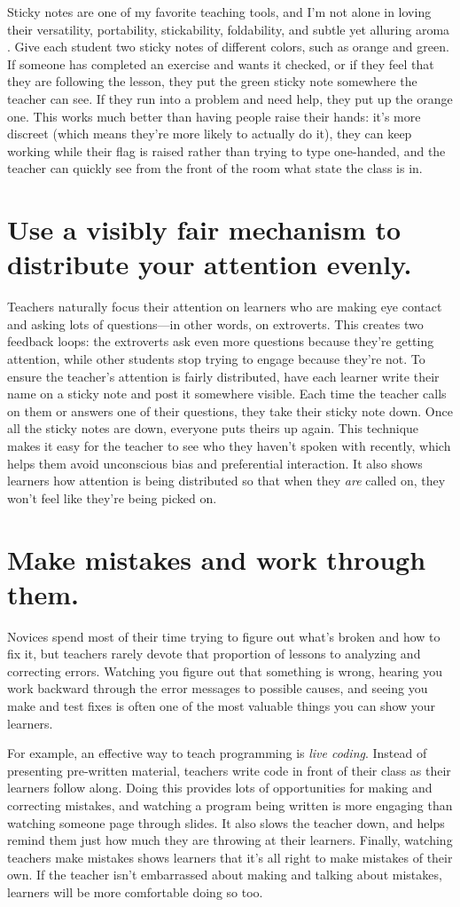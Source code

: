 \documentclass[10pt,letterpaper]{article}
\newcommand{\rulemajor}[1]{\section{#1}}
\begin{document}
Sticky notes are one of my favorite teaching tools,
and I'm not alone in loving their versatility,
portability, stickability, foldability,
and subtle yet alluring aroma \cite{Ward2015}.
Give each student two sticky notes of different colors,
such as orange and green.
If someone has completed an exercise and wants it checked,
or if they feel that they are following the lesson,
they put the green sticky note somewhere the teacher can see.
If they run into a problem and need help,
they put up the orange one.
This works much better than having people raise their hands:
it's more discreet (which means they're more likely to actually do it),
they can keep working while their flag is raised rather than trying to type one-handed,
and the teacher can quickly see from the front of the room what state the class is in.

\rulemajor{Use a visibly fair mechanism to distribute your attention evenly.}

Teachers naturally focus their attention on learners
who are making eye contact and asking lots of questions---in other words, on extroverts.
This creates two feedback loops:
the extroverts ask even more questions because they're getting attention,
while other students stop trying to engage because they're not.
To ensure the teacher's attention is fairly distributed,
have each learner write their name on a sticky note
and post it somewhere visible.
Each time the teacher calls on them or answers one of their questions,
they take their sticky note down.
Once all the sticky notes are down,
everyone puts theirs up again.
This technique makes it easy for the teacher to see who they haven't spoken with recently,
which helps them avoid unconscious bias and preferential interaction.
It also shows learners how attention is being distributed
so that when they \emph{are} called on,
they won't feel like they're being picked on.

\rulemajor{Make mistakes and work through them.}

Novices spend most of their time trying to figure out what's broken and how to fix it,
but teachers rarely devote that proportion of lessons to analyzing and correcting errors.
Watching you figure out that something is wrong,
hearing you work backward through the error messages to possible causes,
and seeing you make and test fixes
is often one of the most valuable things you can show your learners.

For example,
an effective way to teach programming is \emph{live coding}.
Instead of presenting pre-written material,
teachers write code in front of their class as their learners follow along.
Doing this provides lots of opportunities for making and correcting mistakes,
and watching a program being written is more engaging than watching someone page through slides.
It also slows the teacher down,
and helps remind them just how much they are throwing at their learners.
Finally,
watching teachers make mistakes shows learners that it's all right to make mistakes of their own.
If the teacher isn't embarrassed about making and talking about mistakes,
learners will be more comfortable doing so too.
\end{document}
